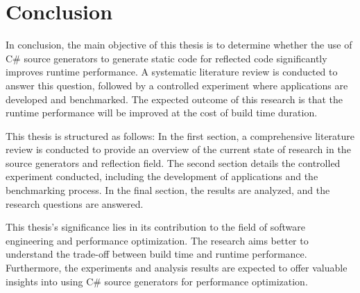 \chapter{Conclusion}

In conclusion, the main objective of this thesis is to determine whether the use of C\# source generators to generate static code for reflected code significantly improves runtime performance. A systematic literature review is conducted to answer this question, followed by a controlled experiment where applications are developed and benchmarked. The expected outcome of this research is that the runtime performance will be improved at the cost of build time duration.

This thesis is structured as follows: In the first section, a comprehensive literature review is conducted to provide an overview of the current state of research in the source generators and reflection field. The second section details the controlled experiment conducted, including the development of applications and the benchmarking process. In the final section, the results are analyzed, and the research questions are answered.

This thesis's significance lies in its contribution to the field of software engineering and performance optimization. The research aims better to understand the trade-off between build time and runtime performance. Furthermore, the experiments and analysis results are expected to offer valuable insights into using C\# source generators for performance optimization.
